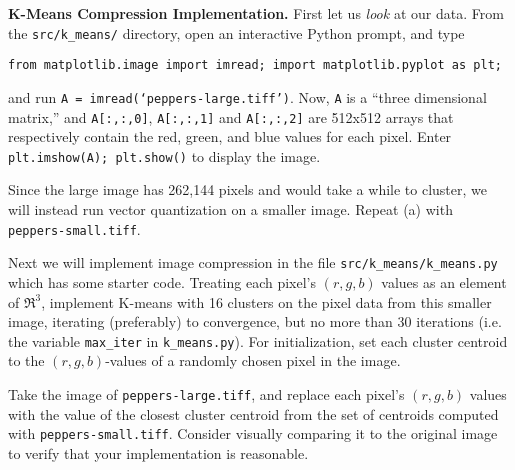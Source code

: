 \item{}
\textbf{K-Means Compression Implementation.}
First let us \emph{look} at our data. From the \texttt{src/k\_means/} directory, open an interactive Python prompt, and type
%
\begin{center}
  \texttt{from matplotlib.image import imread; import matplotlib.pyplot as plt;}
\end{center}
%
and run \texttt{A = imread(`peppers-large.tiff')}. Now, \texttt{A} is a ``three dimensional matrix,'' and \texttt{A[:,:,0]}, \texttt{A[:,:,1]} and \texttt{A[:,:,2]} are 512x512 arrays that respectively contain the red, green, and blue values for each pixel. Enter \texttt{plt.imshow(A); plt.show()} to display the image.


Since the large image has 262,144 pixels and would take a while to cluster, we will instead run vector quantization on a smaller image. Repeat (a) with \texttt{peppers-small.tiff}.


Next we will implement image compression in the file \texttt{src/k\_means/k\_means.py} which has some starter code. Treating each pixel's $(r, g, b)$ values as an element of $\Re^3$, implement K-means with 16 clusters on the pixel data from this smaller image, iterating (preferably) to convergence, but no more than 30 iterations (i.e. the variable {\tt max\_iter} in {\tt k\_means.py}). For initialization, set each cluster centroid to the $(r, g, b)$-values of a randomly chosen pixel in the image.


Take the image of \texttt{peppers-large.tiff}, and replace each pixel's $(r, g, b)$ values with the value of the closest cluster centroid from the set of centroids computed with \texttt{peppers-small.tiff}. Consider visually comparing it to the original image to verify that your implementation is reasonable.

